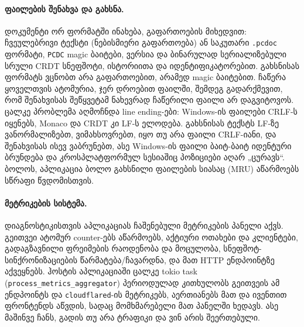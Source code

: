 \paragraph{ფაილების შენახვა და გახსნა.}
დოკუმენტი ორ ფორმატში ინახება, გაფართოების მიხედვით: ჩვეულებრივი ტექსტი
(ნებისმიერი გაფართოება) ან საკუთარი \texttt{.pcdoc} ფორმატი, \texttt{PCDC}
magic ბაიტები, ვერსია და ბინარულად სერიალიზებული სრული CRDT სნეფშოტი,
ისტორიითა და იდენტიფიკატორებით. გახსნისას ფორმატს ვცნობთ არა
გაფართოებით, არამედ magic ბაიტებით. ჩაწერა ყოველთვის ატომურია, ჯერ
დროებით ფაილში, შემდეგ გადარქმევით, რომ შენახვისას შეწყვეტამ
ნახევრად ჩაწერილი ფაილი არ დაგვიტოვოს.
ცალკე პრობლემა აღმოჩნდა line ending-ები: Windows-ის ფაილები CRLF-ს
იყენებს, Monaco და CRDT კი LF-ს ელოდება. გახსნისას ტექსტს LF-ზე
ვანორმალიზებთ, ვიმახსოვრებთ, იყო თუ არა ფაილი CRLF-იანი, და შენახვისას
ისევ ვაბრუნებთ, ასე Windows-ის ფაილი ბაიტ-ბაიტ იდენტური ბრუნდება და
კროსპლატფორმულ სესიაშიც პოზიციები აღარ „ცურავს“. ბოლოს,
აპლიკაცია ბოლო გახსნილი ფაილების სიასაც (MRU) აწარმოებს სწრაფი
წვდომისთვის.

\paragraph{მეტრიკების სისტემა.}
დიაგნოსტიკისთვის აპლიკაციას ჩაშენებული მეტრიკების პანელი აქვს. გეითვეი
ატომურ counter-ებს აწარმოებს, აქტიური ოთახები და კლიენტები, გადაგზავნილი
ფრეიმების რაოდენობა და მოცულობა, სნეფშოტ-სინქრონიზაციების
წარმატება/ჩავარდნა, და მათ HTTP ენდპოინტზე
აქვეყნებს. ჰოსტის აპლიკაციაში ცალკე tokio task
(\texttt{process\_metrics\_aggregator}) პერიოდულად კითხულობს გეითვეის ამ
ენდპოინტს და \texttt{cloudflared}-ის მეტრიკებს, აერთიანებს მათ და
ივენთით ფრონტენდს აწვდის, სადაც მომხმარებელი მათ პანელში ხედავს.
ასე მაშინვე ჩანს, გადის თუ არა ტრაფიკი და ვინ არის შეერთებული.
